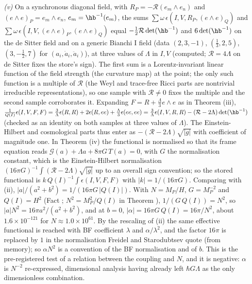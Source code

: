 \emph{(v)} On a synchronous diagonal field, with $R_{P} = -\mathcal{R}(e_{m}\wedge e_{n})$ and $(e\wedge e)_{P} = e_{m}\wedge e_{n}$, $e_{m} = \hb^{-1}(e_{m})$, the sums $\sum\omega\,\epsilon(I, V, R_{P}, (e\wedge e)_{Q})$ and $\sum\omega\,\epsilon(I, V, (e\wedge e)_{P}, (e\wedge e)_{Q})$ equal $-\tfrac12\mathcal{R}\det(\hb^{-1})$ and $6\det(\hb^{-1})$ on the de Sitter field and on a generic Bianchi I field (data $(2, 3, -1)$, $(\tfrac13, 2, 5)$, $(3, -\tfrac12, 7)$ for $(a_{i}, \dot a_{i}, \ddot a_{i})$), at three values of $\Lambda$ in $I, V$ (computed; $\mathcal{R} = 4\Lambda$ on de Sitter fixes the store's sign). The first sum is a Lorentz-invariant linear function of the field strength (the curvature map) at the point; the only such function is a multiple of $\mathcal{R}$ (the Weyl and trace-free Ricci parts are nontrivial irreducible representations), so one sample with $\mathcal{R} \neq 0$ fixes the multiple and the second sample corroborates it. Expanding $F = R + \tfrac{\Lambda}{3}e\wedge e$ as in Theorem (iii), $\tfrac{1}{Q(I)}\epsilon(I, V, F, F) = \tfrac{3}{\Lambda}\epsilon(R, R) + 2\epsilon(R, ee) + \tfrac{\Lambda}{3}\epsilon(ee, ee) = \tfrac{3}{\Lambda}\epsilon(I, V, R, R) - (\mathcal{R} - 2\Lambda)\det(\hb^{-1})$ (checked as an identity on both samples at three values of $\Lambda$). The Einstein-Hilbert and cosmological parts thus enter as $-(\mathcal{R} - 2\Lambda)\sqrt{|g|}$ with coefficient of magnitude one. In Theorem (iv) the functional is normalised so that its frame equation reads $\mathcal{G}(a) + \Lambda a + 8\pi G\,T(a) = 0$, with $G$ the normalisation constant, which is the Einstein-Hilbert normalisation $(16\pi G)^{-1}\int(\mathcal{R} - 2\Lambda)\sqrt{|g|}$ up to an overall sign convention; so the stored functional is $k\,Q(I)^{-1}\int\epsilon(I, V, F, F)$ with $|k| = 1/(16\pi G)$. Comparing with (ii), $|a|/(a^{2} + b^{2}) = 1/(16\pi G\,|Q(I)|)$. With $N = M_{P}/H$, $G = M_{P}^{-2}$ and $Q(I) = H^{2}$ (Fact ; $N^{2} = M_{P}^{2}/Q(I)$ in Theorem ), $1/(G\,Q(I)) = N^{2}$, so $|a| N^{2} = 16\pi a^{2}/(a^{2} + b^{2})$, and at $b = 0$, $|\alpha| = 16\pi G\,Q(I) = 16\pi/N^{2}$, about $1.6 \times 10^{-121}$ for $N \approx 1.0 \times 10^{61}$. By the rescaling of (ii) the same effective functional is reached with BF coefficient $\lambda$ and $\alpha/\lambda^{2}$, and the factor $16\pi$ is replaced by $1$ in the normalisation Freidel and Starodubtsev quote (from memory); so $\alpha N^{2}$ is a convention of the BF normalisation and of $b$. This is the pre-registered test of a relation between the coupling and $N$, and it is negative: $\alpha$ is $N^{-2}$ re-expressed, dimensional analysis having already left $\hbar G\Lambda$ as the only dimensionless combination.

